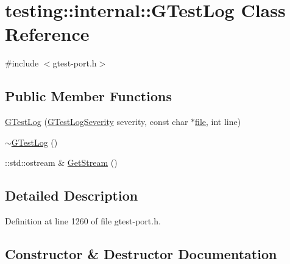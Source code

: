 \hypertarget{classtesting_1_1internal_1_1_g_test_log}{}\section{testing\+:\+:internal\+:\+:G\+Test\+Log Class Reference}
\label{classtesting_1_1internal_1_1_g_test_log}


{\ttfamily \#include $<$gtest-\/port.\+h$>$}

\subsection*{Public Member Functions}
\begin{DoxyCompactItemize}
\item 
\hyperlink{classtesting_1_1internal_1_1_g_test_log_a364691bf972983a59cfa2891062a64af}{G\+Test\+Log} (\hyperlink{namespacetesting_1_1internal_aa6255ef3b023c5b4e1a2198d887fb977}{G\+Test\+Log\+Severity} severity, const char $\ast$\hyperlink{_07copy_08_2_read_camera_model_8m_a151631b2fd2bb776ef06c9f440a7ed74}{file}, int line)
\item 
\hyperlink{classtesting_1_1internal_1_1_g_test_log_a978a099703bbaa0f380216e8d7ee03d3}{$\sim$\+G\+Test\+Log} ()
\item 
\+::std\+::ostream \& \hyperlink{classtesting_1_1internal_1_1_g_test_log_aebb92e67d98eca69f0347d5121dab27a}{Get\+Stream} ()
\end{DoxyCompactItemize}


\subsection{Detailed Description}


Definition at line 1260 of file gtest-\/port.\+h.



\subsection{Constructor \& Destructor Documentation}
